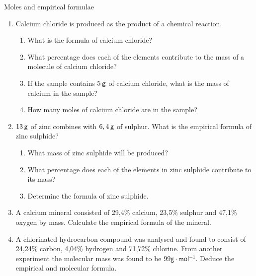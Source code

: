             \begin{exercises}{Moles and empirical formulae
      }
            \nopagebreak \noindent
      \label{m38712*id281924}\begin{enumerate}[noitemsep, label=\textbf{\arabic*}. ] 
            \label{m38712*uid73}\item Calcium chloride is produced as the product of a chemical reaction.
\label{m38712*id281940}\begin{enumerate}[noitemsep, label=\textbf{\alph*}. ] 
            \label{m38712*uid74}\item What is the formula of calcium chloride?
\label{m38712*uid75}\item What percentage does each of the elements contribute to the mass of a molecule of calcium chloride?
\label{m38712*uid76}\item If the sample contains $5\phantom{\rule{2pt}{0ex}}\mathsf{g}$ of calcium chloride, what is the mass of calcium in the sample?
\label{m38712*uid77}\item How many moles of calcium chloride are in the sample?
\end{enumerate}
                \label{m38712*uid78}\item $13\phantom{\rule{2pt}{0ex}}\mathsf{g}$ of zinc combines with $6,4\phantom{\rule{2pt}{0ex}}\mathsf{g}$ of sulphur. What is the empirical formula of zinc sulphide?
\label{m38712*id282007}\begin{enumerate}[noitemsep, label=\textbf{\alph*}. ] 
            \label{m38712*uid79}\item What mass of zinc sulphide will be produced?
\label{m38712*uid80}\item What percentage does each of the elements in zinc sulphide contribute to its mass?
\label{m38712*uid81}\item Determine the formula of zinc sulphide.
\end{enumerate}
                \label{m38712*uid82}\item A calcium mineral consisted of 29,4\% calcium, 23,5\% sulphur and 47,1\% oxygen by mass. Calculate the empirical formula of the mineral.\newline
\label{m38712*uid83}\item A chlorinated hydrocarbon compound was analysed and found to consist of 24,24\% carbon, 4,04\% hydrogen and 71,72\% chlorine. From another experiment the molecular mass was found to be $99\mathsf{g}\ensuremath{\cdot}\mathsf{mol}{}^{-1}$. Deduce the empirical and molecular formula.\newline

\end{enumerate}
\end{exercises}
